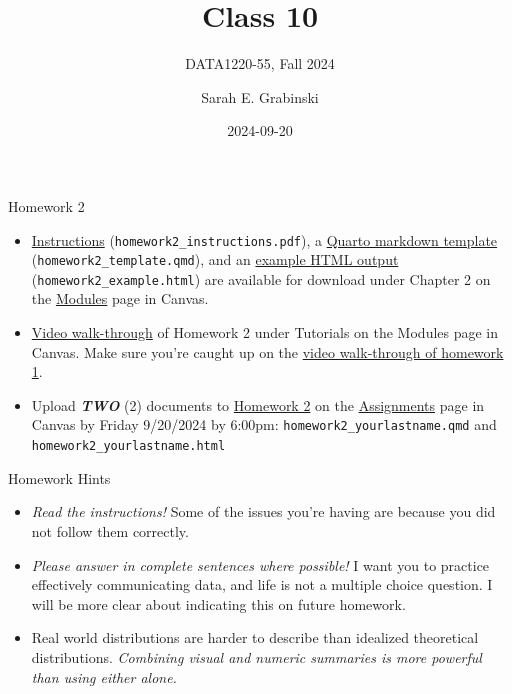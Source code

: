 \documentclass[
  ignorenonframetext,
]{beamer}
\title{Class 10}
\subtitle{DATA1220-55, Fall 2024}
\author{Sarah E. Grabinski}
\date{2024-09-20}
\begin{document}
\frame{\titlepage}

\begin{frame}[fragile]{Homework 2}
\label{homework-2}
\begin{itemize}
\item
  \href{https://canvas.jcu.edu/files/3708401/download?download_frd=1}{Instructions}
  (\texttt{homework2\_instructions.pdf}), a
  \href{https://canvas.jcu.edu/files/3708307/download?download_frd=1}{Quarto
  markdown template} (\texttt{homework2\_template.qmd}), and an
  \href{https://canvas.jcu.edu/files/3708306/download?download_frd=1}{example
  HTML output} (\texttt{homework2\_example.html}) are available for
  download under Chapter 2 on the
  \href{https://canvas.jcu.edu/courses/36290/modules}{Modules} page in
  Canvas.
\item
  \href{https://canvas.jcu.edu/files/3708369/download?download_frd=1}{Video
  walk-through} of Homework 2 under Tutorials on the Modules page in
  Canvas. Make sure you're caught up on the
  \href{https://canvas.jcu.edu/files/3695568/download?download_frd=1}{video
  walk-through of homework 1}.
\item
  Upload \textbf{\emph{TWO}} (2) documents to
  \href{https://canvas.jcu.edu/courses/36290/assignments/451733}{Homework
  2} on the
  \href{https://canvas.jcu.edu/courses/36290/assignments}{Assignments}
  page in Canvas by Friday 9/20/2024 by 6:00pm:
  \texttt{homework2\_yourlastname.qmd} and
  \texttt{homework2\_yourlastname.html}
\end{itemize}
\end{frame}

\begin{frame}{Homework Hints}
\label{homework-hints}
\begin{itemize}
\item
  \emph{Read the instructions!} Some of the issues you're having are
  because you did not follow them correctly.
\item
  \emph{Please answer in complete sentences where possible!} I want you
  to practice effectively communicating data, and life is not a multiple
  choice question. I will be more clear about indicating this on future
  homework.
\item
  Real world distributions are harder to describe than idealized
  theoretical distributions. \emph{Combining visual and numeric
  summaries is more powerful than using either alone.}
\end{itemize}
\end{frame}
\end{document}

